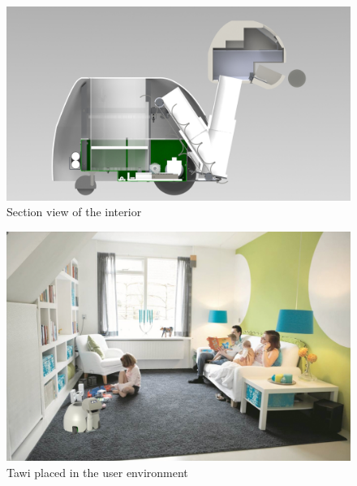 \documentclass[11pt,twoside,a4paper]{report}
\begin{document}
\begin{figure}[H]
\begin{center}
\includegraphics[width=14cm]{Images/RenderAnne3_SectionView.JPG}
\caption{Section view of the interior}
\label{fig:sectionview}
\end{center}
\end{figure}

\begin{figure}[H]
\begin{center}
\includegraphics[width=14cm]{Images/RenderAnne2.JPG}
\caption{Tawi placed in the user environment}
\label{fig:livingroom}
\end{center}
\end{figure}
\end{document}
